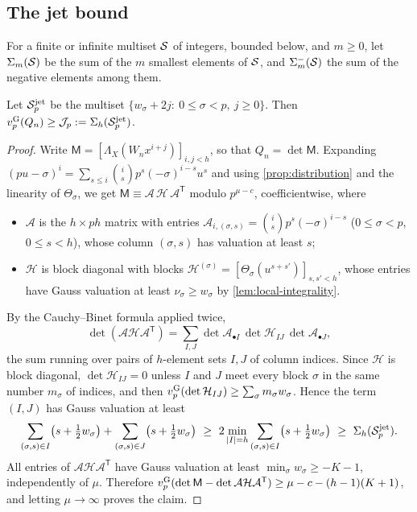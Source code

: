 \subsection{The jet bound}\label{sec:jet-bound}
For a finite or infinite multiset $\mathcal{S}$ of integers, bounded below, and $m\ge0$, let $\Sigma_m(\mathcal{S})$ be the sum of the $m$ smallest elements of $\mathcal{S}$, and $\Sigma^-_m(\mathcal{S})$ the sum of the negative elements among them.

\begin{proposition}\label{prop:jet}
Let $\mathcal{S}^{\mathrm{jet}}_p$ be the multiset $\{w_\sigma+2j:\ 0\le\sigma<p,\ j\ge0\}$. Then $v^{\mathrm{G}}_{p}(Q_n)\ge\mathcal{J}_p:=\Sigma_h(\mathcal{S}^{\mathrm{jet}}_p)$.
\end{proposition}

\begin{proof}
Write $\mathsf M=[\Lambda_X(W_nx^{i+j})]_{i,j<h}$, so that $Q_n=\det\mathsf M$. Expanding $(pu-\sigma)^i=\sum_{s\le i}\binom is p^s(-\sigma)^{i-s}u^s$ and using \cref{prop:distribution} and the linearity of $\Theta_\sigma$, we get $\mathsf M\equiv\mathcal A\,\mathcal H\,\mathcal A^{\mathsf T}$ modulo $p^{\mu-c}$, coefficientwise, where
\begin{itemize}
\item $\mathcal A$ is the $h\times ph$ matrix with entries $\mathcal A_{i,(\sigma,s)}=\binom is p^s(-\sigma)^{i-s}$ ($0\le\sigma<p$, $0\le s<h$), whose column $(\sigma,s)$ has valuation at least $s$;
\item $\mathcal H$ is block diagonal with blocks $\mathcal H^{(\sigma)}=[\Theta_\sigma(u^{s+s'})]_{s,s'<h}$, whose entries have Gauss valuation at least $\nu_\sigma\ge w_\sigma$ by \cref{lem:local-integrality}.
\end{itemize}
By the Cauchy--Binet formula applied twice,
\[
\det(\mathcal A\mathcal H\mathcal A^{\mathsf T})=\sum_{I,J}\det\mathcal A_{\bullet I}\,\det\mathcal H_{IJ}\,\det\mathcal A_{\bullet J},
\]
the sum running over pairs of $h$-element sets $I,J$ of column indices. Since $\mathcal H$ is block diagonal, $\det\mathcal H_{IJ}=0$ unless $I$ and $J$ meet every block $\sigma$ in the same number $m_\sigma$ of indices, and then $v^{\mathrm{G}}_{p}(\det\mathcal H_{IJ})\ge\sum_\sigma m_\sigma w_\sigma$. Hence the term $(I,J)$ has Gauss valuation at least
\[
\sum_{(\sigma,s)\in I}\bigl(s+\tfrac12w_\sigma\bigr)+\sum_{(\sigma,s)\in J}\bigl(s+\tfrac12w_\sigma\bigr)\ \ge\ 2\min_{|I|=h}\sum_{(\sigma,s)\in I}\bigl(s+\tfrac12w_\sigma\bigr)\ \ge\ \Sigma_h(\cS^{\mathrm{jet}}_p).
\]
All entries of $\mathcal A\mathcal H\mathcal A^{\mathsf T}$ have Gauss valuation at least $\min_\sigma w_\sigma\ge-K-1$, independently of $\mu$. Therefore $v^{\mathrm{G}}_{p}(\det\mathsf M-\det\mathcal A\mathcal H\mathcal A^{\mathsf T})\ge \mu-c-(h-1)(K+1)$, and letting $\mu\to\infty$ proves the claim.
\end{proof}

